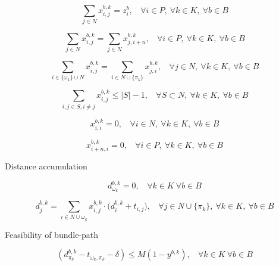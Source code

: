 \documentclass[12pt ]{article}
\begin{document}
\begin{equation}
	\sum_{ j \in N } x_{i,j}^{b,k} = z_{i}^{b},~~~~\forall i \in P,~\forall k \in K,~\forall b \in B
	\label{eq:taskMembership_flowEnforcement}
\end{equation}

\begin{equation}
	\sum_{ j \in N } x_{i,j}^{b,k} = \sum_{ j \in N } x_{j,i+n}^{b,k},~~~~\forall i \in P,~\forall k \in K,~\forall b \in B
	\label{eq:pickupDeliveryConservation}
\end{equation}

\begin{equation}
	\sum_{ i \in \{ \omega_{k} \} \cup N} x_{i,j}^{b,k} = \sum_{ i \in N \cup \{ \pi_{k} \} } x_{j,i}^{b,k},~~~~\forall j \in N,~\forall k \in K,~\forall b \in B
	\label{eq:flowConservation}
\end{equation}


\begin{equation}
	\sum_{ i, j \in S, i \neq j } x_{i,j}^{b,k} \leq \left\vert{S}\right\vert -1 ,~~~~\forall S \subset N,~\forall k \in K,~\forall b \in B
	\label{eq:subtourElimination}
\end{equation}



\begin{equation}
	x_{i,i}^{b,k} = 0,~~~~\forall i \in N,~\forall k \in K,~\forall b \in B
	\label{eq:zeroFlow}
\end{equation}

\begin{equation}
	x_{i + n,i}^{b,k} = 0,~~~~\forall i \in P,~\forall k \in K,~\forall b \in B
	\label{eq:reverseFlow}
\end{equation}


\noindent Distance accumulation

\begin{equation}
	d_{\omega_k}^{b,k} = 0,~~~~\forall k \in K~\forall b \in B
	\label{eq:initBeginningDistance}
\end{equation}

\begin{equation}
	d_{j}^{b,k} = \sum_{ i \in N \cup \omega_k} x_{i,j}^{b,k} \cdot \big( d_i^{b,k} + t_{i,j} \big),~~~~\forall j \in N \cup \{ \pi_{k} \},~\forall k \in K,~\forall b \in B
	\label{eq:calcAccumulatedDistance}
\end{equation}

\noindent Feasibility of bundle-path

\begin{equation} 
	(d_{\pi_k}^{b, k} - t_{\omega_k, \pi_k} - \delta) \le M (1 - y^{b, k}),~~~~\forall k \in K~\forall b \in B
	\label{eq:accumulatedDistanceFeasibility}
\end{equation}
\end{document}
